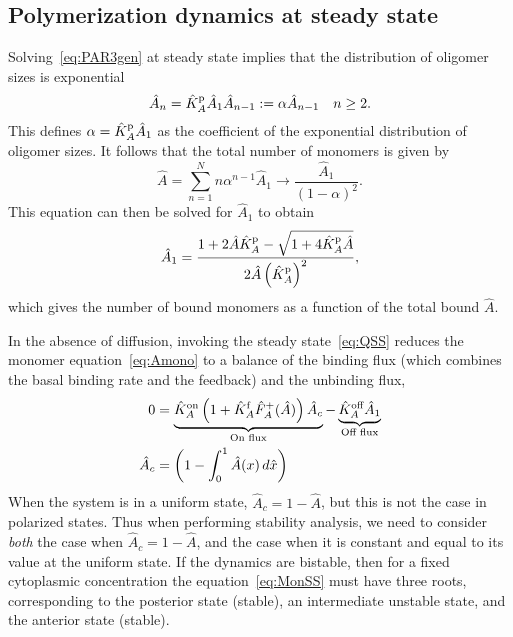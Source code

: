 \documentclass[11pt]{article}
\newcommand{\6}[1]{#1_{\text{6}}}
\newcommand{\3}[1]{#1_{\text{3}}}
\begin{document}
\subsection{Polymerization dynamics at steady state}
Solving\ \eqref{eq:PAR3gen} at steady state implies that the distribution of oligomer sizes is exponential \cite{edelstein1998models,lang2022oligomerization}
\begin{equation}
\label{eq:QSS}
\hat A_n =  \hat{K}^\text{p}_A \hat A_1 \hat A_{n-1}:=\alpha \hat A_{n-1} \quad n \geq 2.
\end{equation}
This defines $\alpha= \hat{K}^\text{p}_A \hat A_1$ as the coefficient of the exponential distribution of oligomer sizes. It follows that the total number of monomers is given by 
\begin{equation}
\hat A = \sum_{n=1}^N n \alpha^{n-1} \hat A_1 \rightarrow \frac{\hat A_1}{\left(1-\alpha\right)^2}.
\end{equation}
This equation can then be solved for $\hat A_1$ to obtain \cite[Eq.~(12)]{lang2022oligomerization}
\begin{equation}
\label{eq:AmonA}
\hat A_1 = \frac{1+2\hat A \hat{K}^\text{p}_A-\sqrt{1+4 \hat{K}^\text{p}_A \hat A}}{2 \hat A \left(\hat{K}^\text{p}_A\right)^2},
\end{equation}
which gives the number of bound monomers as a function of the total bound $\hat A$. 

In the absence of diffusion, invoking the steady state\ \eqref{eq:QSS} reduces the monomer equation\ \eqref{eq:Amono} to a balance of the binding flux (which combines the basal binding rate and the feedback) and the unbinding flux,
\begin{align}
\label{eq:MonSS}
0&= \underbrace{\hat{K}^\text{on}_A \left(1+\hat{K}^\text{f}_A \hat F_A^+(\hat A) \right)\hat A_c}_\text{On flux} - \underbrace{\hat{K}^\text{off}_A  \hat A_1}_\text{Off flux}\\ \nonumber
\hat A_c &= \left(1 - \int_0^1 \hat A(x) \, d\hat{x} \right)
\end{align}
When the system is in a uniform state, $\hat A_c = 1-\hat A$, but this is not the case in polarized states. Thus when performing stability analysis, we need to consider \emph{both} the case when $\hat A_c = 1-\hat A$, and the case when it is constant and equal to its value at the uniform state. If the dynamics are bistable, then for a fixed cytoplasmic concentration the equation\ \eqref{eq:MonSS} must have three roots, corresponding to the posterior state (stable), an intermediate unstable state, and the anterior state (stable). 
\end{document}
